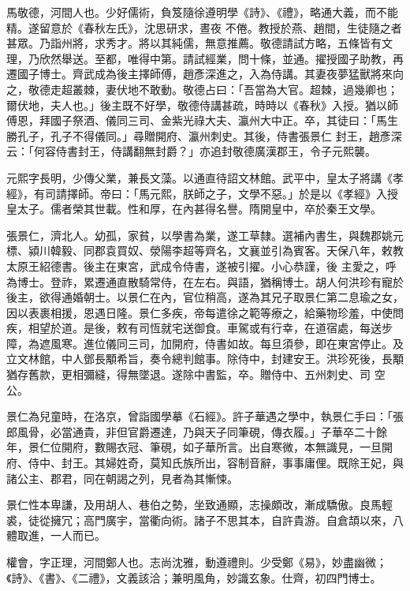 \begin{pinyinscope}
 馬敬德，河間人也。少好儒術，負笈隨徐遵明學《詩》、《禮》，略通大義，而不能精。遂留意於《春秋左氏》，沈思研求，晝夜
 不倦。教授於燕、趙間，生徒隨之者甚眾。乃詣州將，求秀才。將以其純儒，無意推薦。敬德請試方略，五條皆有文理，乃欣然舉送。至都，唯得中第。請試經業，問十條，並通。擢授國子助教，再遷國子博士。齊武成為後主擇師傅，趙彥深進之，入為侍講。其妻夜夢猛獸將來向之，敬德走超叢棘，妻伏地不敢動。敬德占曰：「吾當為大官。超棘，過幾卿也；爾伏地，夫人也。」後主既不好學，敬德侍講甚疏，時時以《春秋》入授。猶以師傅恩，拜國子祭酒、儀同三司、金紫光祿大夫、瀛州大中正。卒，其徒曰：「馬生勝孔子，孔子不得儀同。」尋贈開府、瀛州刺史。其後，侍書張景仁
 封王，趙彥深云：「何容侍書封王，侍講翻無封爵？」亦追封敬德廣漢郡王，令子元熙襲。



 元熙字長明，少傳父業，兼長文藻。以通直待詔文林館。武平中，皇太子將講《孝經》，有司請擇師。帝曰：「馬元熙，朕師之子，文學不惡。」於是以《孝經》入授皇太子。儒者榮其世載。性和厚，在內甚得名譽。隋開皇中，卒於秦王文學。



 張景仁，濟北人。幼孤，家貧，以學書為業，遂工草隸。選補內書生，與魏郡姚元標、潁川韓毅、同郡袁買奴、滎陽李超等齊名，文襄並引為賓客。天保八年，敕教太原王紹德書。後主在東宮，武成令侍書，遂被引擢。小心恭謹，後
 主愛之，呼為博士。登祚，累遷通直散騎常侍，在左右。與語，猶稱博士。胡人何洪珍有寵於後主，欲得通婚朝士。以景仁在內，官位稍高，遂為其兄子取景仁第二息瑜之女，因以表裹相援，恩遇日隆。景仁多疾，帝每遣徐之範等療之，給藥物珍羞，中使問疾，相望於道。是後，敕有司恆就宅送御食。車駕或有行幸，在道宿處，每送步障，為遮風寒。進位儀同三司，加開府，侍書如故。每旦須參，即在東宮停止。及立文林館，中人鄧長顒希旨，奏令總判館事。除侍中，封建安王。洪珍死後，長顒猶存舊款，更相彌縫，得無墜退。遂除中書監，卒。贈侍中、五州刺史、司
 空公。



 景仁為兒童時，在洛京，曾詣國學摹《石經》。許子華遇之學中，執景仁手曰：「張郎風骨，必當通貴，非但官爵遷達，乃與天子同筆硯，傳衣履。」子華卒二十餘年，景仁位開府，數賜衣冠、筆硯，如子華所言。出自寒微，本無識見，一旦開府、侍中、封王。其婦姓奇，莫知氏族所出，容制音辭，事事庸俚。既除王妃，與諸公主、郡君，同在朝謁之列，見者為其慚悚。



 景仁性本卑謙，及用胡人、巷伯之勢，坐致通顯，志操頗改，漸成驕傲。良馬輕裘，徒從擁冗；高門廣宇，當衢向術。諸子不思其本，自許貴游。自倉頡以來，八體取進，一人而已。



 權會，字正理，河間鄭人也。志尚沈雅，動遵禮則。少受鄭《易》，妙盡幽微；《詩》、《書》、《二禮》，文義該洽；兼明風角，妙識玄象。仕齊，初四門博士。




\end{pinyinscope}
